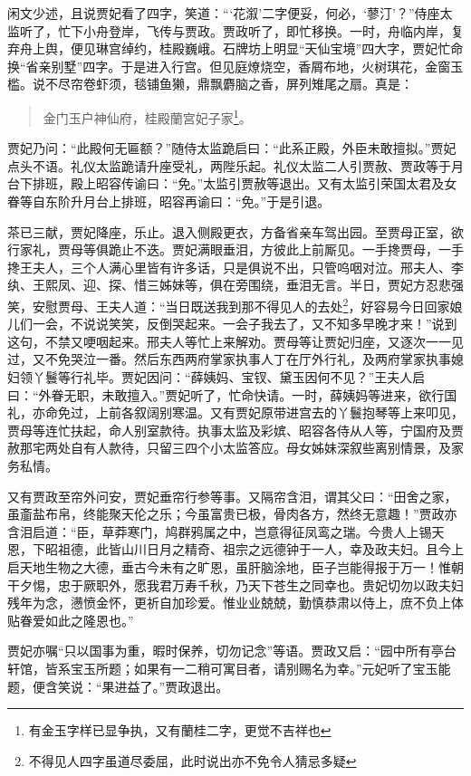 \documentclass[12pt,oneside]{book}
\newenvironment{shici}{%
\begin{verse}%
\centering\large\hspace{12pt}}%
{\end{verse}}
\begin{document}
闲文少述，且说贾妃看了四字，笑道：“‘花溆’二字便妥，何必，‘蓼汀’？”侍座太监听了，忙下小舟登岸，飞传与贾政。贾政听了，即忙移换。一时，舟临内岸，复弃舟上舆，便见琳宫绰约，桂殿巍峨。石牌坊上明显“天仙宝境”四大字，贾妃忙命换“省亲别墅”四字。于是进入行宫。但见庭燎烧空，香屑布地，火树琪花，金窗玉槛。说不尽帘卷虾须，毯铺鱼獭，鼎飘麝脑之香，屏列雉尾之扇。真是：

\begin{shici}
金门玉户神仙府，桂殿蘭宫妃子家\footnote{有金玉字样已显争执，又有蘭桂二字，更觉不吉祥也}。
\end{shici}


贾妃乃问：“此殿何无匾额？”随侍太监跪启曰：“此系正殿，外臣未敢擅拟。”贾妃点头不语。礼仪太监跪请升座受礼，两陛乐起。礼仪太监二人引贾赦、贾政等于月台下排班，殿上昭容传谕曰：“免。”太监引贾赦等退出。又有太监引荣国太君及女眷等自东阶升月台上排班，昭容再谕曰：“免。”于是引退。

茶已三献，贾妃降座，乐止。退入侧殿更衣，方备省亲车驾出园。至贾母正室，欲行家礼，贾母等俱跪止不迭。贾妃满眼垂泪，方彼此上前厮见。一手搀贾母，一手搀王夫人，三个人满心里皆有许多话，只是俱说不出，只管呜咽对泣。邢夫人、李纨、王熙凤、迎、探、惜三姊妹等，俱在旁围绕，垂泪无言。半日，贾妃方忍悲强笑，安慰贾母、王夫人道：“当日既送我到那不得见人的去处\footnote{不得见人四字虽道尽委屈，此时说出亦不免令人猜忌多疑}，好容易今日回家娘儿们一会，不说说笑笑，反倒哭起来。一会子我去了，又不知多早晚才来！”说到这句，不禁又哽咽起来。邢夫人等忙上来解劝。贾母等让贾妃归座，又逐次一一见过，又不免哭泣一番。然后东西两府掌家执事人丁在厅外行礼，及两府掌家执事媳妇领丫鬟等行礼毕。贾妃因问：“薛姨妈、宝钗、黛玉因何不见？”王夫人启曰：“外眷无职，未敢擅入。”贾妃听了，忙命快请。一时，薛姨妈等进来，欲行国礼，亦命免过，上前各叙阔别寒温。又有贾妃原带进宫去的丫鬟抱琴等上来叩见，贾母等连忙扶起，命人别室款待。执事太监及彩嫔、昭容各侍从人等，宁国府及贾赦那宅两处自有人款待，只留三四个小太监答应。母女姊妹深叙些离别情景，及家务私情。

又有贾政至帘外问安，贾妃垂帘行参等事。又隔帘含泪，谓其父曰：“田舍之家，虽齑盐布帛，终能聚天伦之乐；今虽富贵已极，骨肉各方，然终无意趣！”贾政亦含泪启道：“臣，草莽寒门，鸠群鸦属之中，岂意得征凤鸾之瑞。今贵人上锡天恩，下昭祖德，此皆山川日月之精奇、祖宗之远德钟于一人，幸及政夫妇。且今上启天地生物之大德，垂古今未有之旷恩，虽肝脑涂地，臣子岂能得报于万一！惟朝干夕惕，忠于厥职外，愿我君万寿千秋，乃天下苍生之同幸也。贵妃切勿以政夫妇残年为念，懑愤金怀，更祈自加珍爱。惟业业兢兢，勤慎恭肃以侍上，庶不负上体贴眷爱如此之隆恩也。”

贾妃亦嘱“只以国事为重，暇时保养，切勿记念”等语。贾政又启：“园中所有亭台轩馆，皆系宝玉所题；如果有一二稍可寓目者，请别赐名为幸。”元妃听了宝玉能题，便含笑说：“果进益了。”贾政退出。
\end{document}
